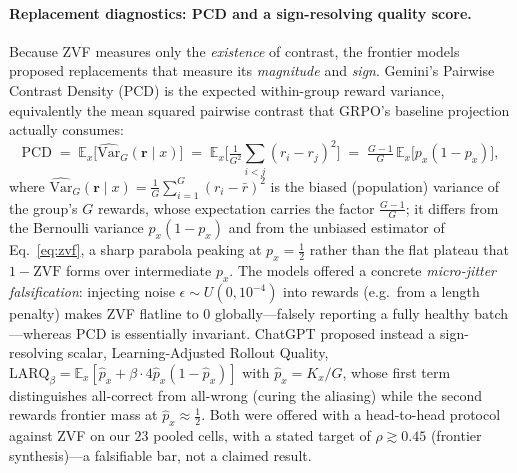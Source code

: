 \paragraph{Replacement diagnostics: PCD and a sign-resolving quality score.}
Because ZVF measures only the \emph{existence} of contrast, the frontier
models proposed replacements that measure its \emph{magnitude} and
\emph{sign}. Gemini's Pairwise Contrast Density (PCD) is the expected
within-group reward variance, equivalently the mean squared pairwise
contrast that GRPO's baseline projection actually consumes:
\begin{equation}
  \mathrm{PCD}
  \;=\; \mathbb{E}_{x}\!\big[\widehat{\mathrm{Var}}_G(\mathbf r\mid x)\big]
  \;=\; \mathbb{E}_{x}\!\Big[\tfrac{1}{G^2}\!\sum_{i<j}(r_i-r_j)^2\Big]
  \;=\; \tfrac{G-1}{G}\,\mathbb{E}_{x}\!\big[p_x(1-p_x)\big],
  \label{eq:pcd}
\end{equation}
where $\widehat{\mathrm{Var}}_G(\mathbf r\mid x)=\tfrac1G\sum_{i=1}^G(r_i-\bar r)^2$ is
the biased (population) variance of the group's $G$ rewards, whose expectation
carries the factor $\tfrac{G-1}{G}$; it differs from the Bernoulli variance
$p_x(1-p_x)$ and from the unbiased estimator of Eq.~\eqref{eq:zvf},
a sharp parabola peaking at $p_x=\tfrac12$ rather than the flat plateau
that $1-\mathrm{ZVF}$ forms over intermediate $p_x$. The models offered a
concrete \emph{micro-jitter falsification}: injecting noise
$\epsilon\sim U(0,10^{-4})$ into rewards (e.g.\ from a length penalty)
makes ZVF flatline to $0$ globally---falsely reporting a fully healthy
batch---whereas PCD is essentially invariant. ChatGPT proposed instead a
sign-resolving scalar, Learning-Adjusted Rollout Quality,
$\mathrm{LARQ}_\beta=\mathbb{E}_x[\hat p_x+\beta\cdot4\hat p_x(1-\hat p_x)]$
with $\hat p_x=K_x/G$, whose first term distinguishes all-correct from
all-wrong (curing the aliasing) while the second rewards frontier mass at
$\hat p_x\approx\tfrac12$. Both were offered with a head-to-head protocol
against ZVF on our $23$ pooled cells, with a stated target of
$\rho\gtrsim0.45$ (frontier synthesis)---a falsifiable bar, not a claimed
result.

